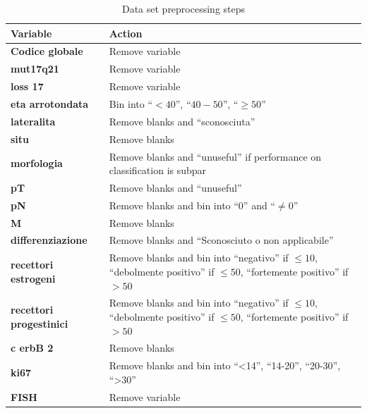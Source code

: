 \begin{table}[htbp]
\centering
\caption{Data set preprocessing steps}
\begin{tabularx}{\textwidth}{@{} l Y @{}}
\toprule 
\textbf{Variable} & Action \\
\midrule 
\textbf{Codice globale} & Remove variable \\
\textbf{mut17q21} & Remove variable \\
\textbf{loss 17} & Remove variable \\
\textbf{eta arrotondata} & Bin into \enquote{$< 40$}, \enquote{$40-50$}, \enquote{$\geq 50$} \\
\textbf{lateralita} & Remove blanks and \enquote{sconosciuta} \\
\textbf{situ} & Remove blanks \\ \addlinespace
\textbf{morfologia} & Remove blanks and \enquote{unuseful} if performance on classification is subpar \\ \addlinespace
\textbf{pT} & Remove blanks and \enquote{unuseful}  \\
\textbf{pN} & Remove blanks and bin into \enquote{0} and \enquote{$\neq0$}\\
\textbf{M} & Remove blanks \\ 
\textbf{differenziazione} & Remove blanks and \enquote{Sconosciuto o non applicabile} \\ \addlinespace
\textbf{recettori estrogeni} & Remove blanks and bin into \enquote{negativo} if $\leq 10$,
		\enquote{debolmente positivo} if $\leq 50$, 
		\enquote{fortemente positivo} if $> 50$ \\ \addlinespace
\textbf{recettori progestinici} & Remove blanks and bin into \enquote{negativo} if $\leq 10$, 
		\enquote{debolmente positivo} if $\leq 50$, 
		\enquote{fortemente positivo} if $> 50$ \\ \addlinespace
\textbf{c erbB 2} & Remove blanks \\ 
\textbf{ki67} & Remove blanks and bin into \enquote{<14}, 
		\enquote{14-20}, \enquote{20-30}, \enquote{>30} \\ 
\textbf{FISH} & Remove variable \\
\bottomrule
\end{tabularx}
\label{tab:datasetpreprocess}
\end{table}

